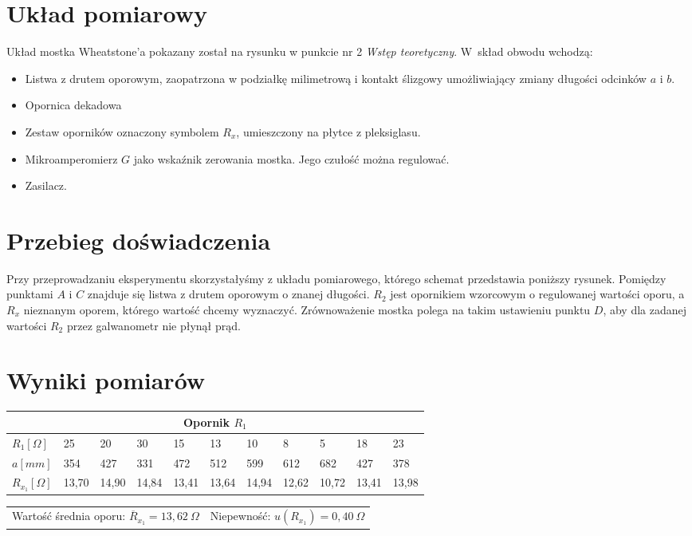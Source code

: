 \documentclass[a4paper,11pt]{article}
\begin{document}
\section{Układ pomiarowy}
Układ mostka Wheatstone’a pokazany został na rysunku w punkcie nr 2 \textit{Wstęp teoretyczny}. W~skład obwodu wchodzą:
\begin{itemize}
\item Listwa z drutem oporowym, zaopatrzona w podziałkę milimetrową i kontakt ślizgowy umożliwiający zmiany długości odcinków $a$ i $b$.
\item  Opornica dekadowa
\item  Zestaw oporników oznaczony symbolem $R_x$, umieszczony na płytce z pleksiglasu.
\item Mikroamperomierz $G$ jako wskaźnik zerowania mostka. Jego czułość można regulować.
\item Zasilacz.
\end{itemize}

\section{Przebieg doświadczenia}
Przy przeprowadzaniu eksperymentu skorzystałyśmy z układu pomiarowego, którego schemat przedstawia poniższy rysunek. Pomiędzy punktami $A$ i $C$ znajduje się listwa z  drutem oporowym o znanej długości. $R_2$ jest opornikiem wzorcowym o regulowanej wartości oporu, a $R_x$ nieznanym oporem, którego wartość chcemy wyznaczyć. Zrównoważenie mostka polega na takim ustawieniu punktu $D$, aby dla zadanej wartości $R_2$ przez galwanometr nie płynął prąd.

\section{Wyniki pomiarów}


\begin{table}[!ht]
\setlength{\extrarowheight}{5pt}
\centering
\begin{tabularx}{\textwidth}{XXXXXXXXXXX}

\multicolumn{11}{c}{\textbf{Opornik $R_1$}}\\        
\hline
$R_1[\Omega]$  & 25 & 20 & 30 & 15 & 13 & 10 & 8 & 5 & 18 & 23 \\
\hline
$a[mm]$  & 354 & 427 & 331 & 472 & 512 & 599 & 612 & 682 & 427 & 378  \\
\hline
$R_{x_1}[\Omega]$ & 13,70 &	14,90 &	14,84 &	13,41 &	13,64 &	14,94 &	12,62 &	10,72 &	13,41 &	13,98
\\    
\hline   
\end{tabularx}
\begin{tabularx}{\textwidth}{XX}
\centering
Wartość średnia oporu: $\overline{R}_{x_1}= 13,62~\Omega$ & Niepewność: $u(R_{x_1})=0,40 ~\Omega $\\

\end{tabularx}
\end{table}
\end{document}
